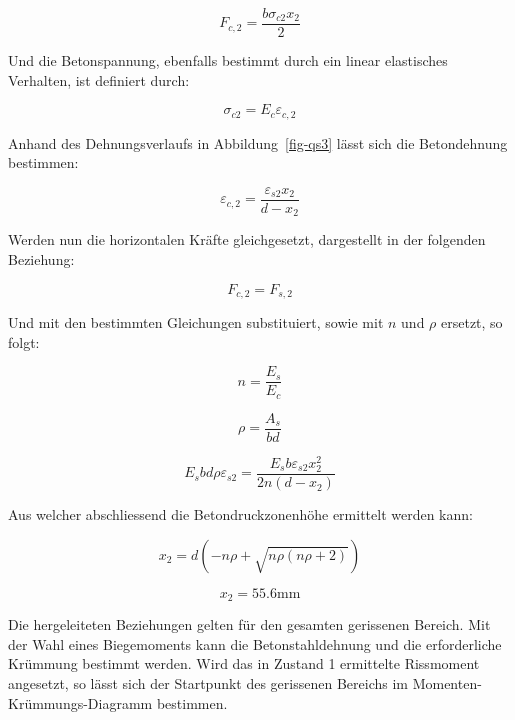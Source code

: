 \documentclass[
  12pt,
  letterpaper,
  egregdoesnotlikesansseriftitles]{scrreprt}
\begin{document}
\begin{equation}F_{c,2} = \frac{b \sigma_{c 2} x_{2}}{2}\end{equation}

Und die Betonspannung, ebenfalls bestimmt durch ein linear elastisches
Verhalten, ist definiert durch:

\begin{equation}\sigma_{c 2} = E_{c} \varepsilon_{c,2}\end{equation}

Anhand des Dehnungsverlaufs in Abbildung~\ref{fig-qs3} lässt sich die
Betondehnung bestimmen:

\begin{equation}\varepsilon_{c,2} = \frac{\varepsilon_{s2} x_{2}}{d - x_{2}}\end{equation}

Werden nun die horizontalen Kräfte gleichgesetzt, dargestellt in der
folgenden Beziehung:

\begin{equation}F_{c,2} = F_{s,2}\end{equation}

Und mit den bestimmten Gleichungen substituiert, sowie mit \(n\) und
\(\rho\) ersetzt, so folgt:

\begin{equation}n = \frac{E_{s}}{E_{c}}\end{equation}

\begin{equation}\rho = \frac{A_{s}}{b d}\end{equation}

\begin{equation}E_{s} b d \rho \varepsilon_{s2} = \frac{E_{s} b \varepsilon_{s2} x_{2}^{2}}{2 n \left(d - x_{2}\right)}\end{equation}

Aus welcher abschliessend die Betondruckzonenhöhe ermittelt werden kann:

\begin{equation}x_{2} = d \left(- n \rho + \sqrt{n \rho \left(n \rho + 2\right)}\right)\end{equation}

\begin{equation}x_{2} = 55.6 \text{mm}\end{equation}

Die hergeleiteten Beziehungen gelten für den gesamten gerissenen
Bereich. Mit der Wahl eines Biegemoments kann die Betonstahldehnung und
die erforderliche Krümmung bestimmt werden. Wird das in Zustand 1
ermittelte Rissmoment angesetzt, so lässt sich der Startpunkt des
gerissenen Bereichs im Momenten-Krümmungs-Diagramm bestimmen.
\end{document}
